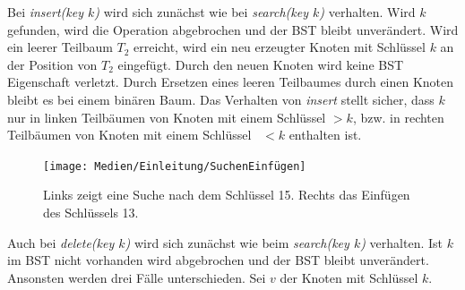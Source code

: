 \documentclass[a4paper,12pt]{article}
\begin{document}
Bei \textit{insert(key $k$)} wird sich zunächst wie bei  \textit{search(key $k$)} verhalten. Wird $k$ gefunden, wird die Operation abgebrochen und der BST bleibt unverändert. Wird ein leerer Teilbaum $T_2$ erreicht, wird ein neu erzeugter Knoten mit Schlüssel $k$ an der Position von $T_2$ eingefügt. Durch den neuen Knoten wird keine BST Eigenschaft verletzt. Durch Ersetzen eines leeren Teilbaumes durch einen Knoten bleibt es bei einem binären Baum. Das Verhalten von  \textit{insert} stellt sicher, dass $k$ nur in linken Teilbäumen von Knoten mit einem Schlüssel $> k$, bzw. in rechten Teilbäumen von Knoten mit einem Schlüssel~ $< k$ enthalten ist.    \\
\begin{figure}[H]
	\centering
	\texttt{[image: Medien/Einleitung/SuchenEinfügen]}
	\caption{Links zeigt eine Suche nach dem Schlüssel 15. Rechts das Einfügen des Schlüssels 13.}
	\label{fig:SuchenEinfügen}
\end{figure}
\noindent Auch bei \textit{delete(key $k$)} wird sich zunächst wie beim  \textit{search(key $k$)} verhalten. Ist $k$ im BST nicht vorhanden wird abgebrochen und der BST bleibt unverändert. Ansonsten werden drei Fälle unterschieden.
Sei $v$ der Knoten mit Schlüssel $k$.
\end{document}
